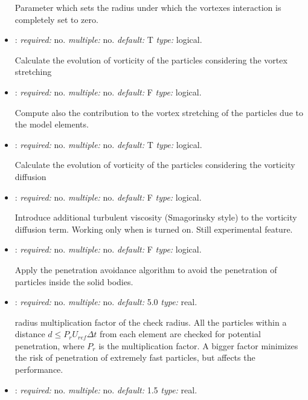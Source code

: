 \begin{itemize}
Parameter which sets the radius under which the vortexes interaction is completely set to zero.

\item {}: \textit{required:} no. \textit{multiple:} no. 
\textit{default:} T \textit{type:} logical.

Calculate the evolution of vorticity of the particles considering the 
vortex stretching

\item {}: \textit{required:} no. 
\textit{multiple:} no. \textit{default:} F \textit{type:} logical.

Compute also the contribution to the vortex stretching of the particles 
due to the model elements. 

\item {}: \textit{required:} no. \textit{multiple:} no. 
\textit{default:} T \textit{type:} logical.

Calculate the evolution of vorticity of the particles considering the vorticity diffusion

\item {}: \textit{required:} no. \textit{multiple:} no. 
\textit{default:} F \textit{type:} logical.

Introduce additional turbulent viscosity (Smagorinsky style) to the vorticity 
diffusion term. Working only when  is turned on. Still experimental feature. 

\item {}: \textit{required:} no. \textit{multiple:} no. 
\textit{default:} F \textit{type:} logical.

Apply the penetration avoidance algorithm to avoid the penetration of particles 
inside the solid bodies.

\item {}: \textit{required:} no. 
\textit{multiple:} no. \textit{default:} 5.0 \textit{type:} real.

radius multiplication factor of the check radius. All the particles within a 
distance $d\leq P_r U_{ref} \Delta t$ from each element are checked for 
potential penetration, where $P_r$ is the multiplication factor. 
A bigger factor minimizes the risk of penetration of extremely fast particles, 
but affects the performance. 

\item {}: \textit{required:} no. 
\textit{multiple:} no. \textit{default:} 1.5 \textit{type:} real.


\end{itemize}
